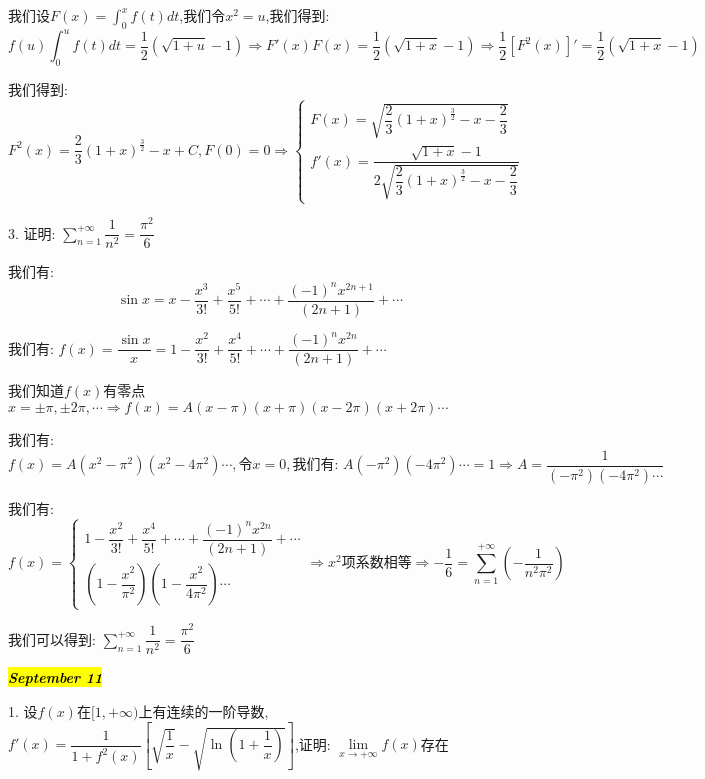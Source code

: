 \begin{solution}

	我们设$F(x)=\int_{0}^{x}f(t)dt$,我们令$x^2=u$,我们得到:  
	$$f(u)\int_{0}^{u}f(t)dt=\dfrac{1}{2}(\sqrt{1+u}-1)\Rightarrow F'(x)F(x)=\dfrac{1}{2}(\sqrt{1+x}-1)\Rightarrow \dfrac{1}{2}[F^2(x)]'=\dfrac{1}{2}(\sqrt{1+x}-1)$$
	
	我们得到:  
	$$F^2(x)=\dfrac{2}{3}(1+x)^{\frac{3}{2}}-x+C,F(0)=0\Rightarrow \left\lbrace
	\begin{array}{l}
		F(x)=\sqrt{\dfrac{2}{3}(1+x)^{\frac{3}{2}}-x-\dfrac{2}{3}}\\
		f'(x)=\dfrac{\sqrt{1+x}-1}{2\sqrt{\dfrac{2}{3}(1+x)^{\frac{3}{2}}-x-\dfrac{2}{3}}}
	\end{array}
	\right. $$
\end{solution}

3. 证明:  $\sum\limits_{n=1}^{+\infty}\dfrac{1}{n^2}=\dfrac{\pi^2}{6}$

\begin{solution}

	我们有:  
	$$\sin x=x-\dfrac{x^3}{3!}+\dfrac{x^5}{5!}+\cdots+\dfrac{(-1)^{n}x^{2n+1}}{(2n+1)}+\cdots$$
	
	我们有:  $f(x)=\dfrac{\sin x}{x}=1-\dfrac{x^2}{3!}+\dfrac{x^4}{5!}+\cdots+\dfrac{(-1)^{n}x^{2n}}{(2n+1)}+\cdots$
	
	我们知道$f(x)$有零点$x=\pm\pi,\pm 2\pi,\cdots\Rightarrow f(x)=A(x-\pi)(x+\pi)(x-2\pi)(x+2\pi)\cdots$
	
	
	我们有:  
	$$f(x)=A(x^2-\pi^2)(x^2-4\pi^2)\cdots,\text{令}x=0,\text{我们有:  }A(-\pi^2)(-4\pi^2)\cdots=1\Rightarrow A=\dfrac{1}{(-\pi^2)(-4\pi^2)\cdots}$$
	
	我们有:  $$f(x)=\left\lbrace
	\begin{array}{l}
		1-\dfrac{x^2}{3!}+\dfrac{x^4}{5!}+\cdots+\dfrac{(-1)^{n}x^{2n}}{(2n+1)}+\cdots\\
		(1-\dfrac{x^2}{\pi^2})(1-\dfrac{x^2}{4\pi^2})\cdots
	\end{array}
	\right. \Rightarrow x^2\text{项系数相等}\Rightarrow -\dfrac{1}{6}=\sum\limits_{n=1}^{+\infty}(-\dfrac{1}{n^2\pi^2})$$
	
	我们可以得到:  $\sum\limits_{n=1}^{+\infty}\dfrac{1}{n^2}=\dfrac{\pi^2}{6}$
\end{solution}

\hl{\textbf{\textit{September 11}}}

1. 设$f(x)$在$[1,+\infty)$上有连续的一阶导数,$f'(x)=\dfrac{1}{1+f^{2}(x)}\left[\sqrt{\dfrac{1}{x}}-\sqrt{\ln(1+\dfrac{1}{x})} \right] $,证明:  $\lim\limits_{x\rightarrow +\infty}f(x)$存在

